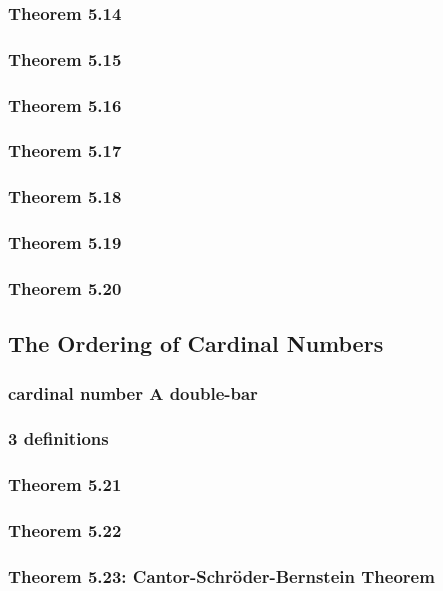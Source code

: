 \documentclass[a4paper]{article}
\begin{document}
\subsubsection*{Theorem 5.14}
\subsubsection*{Theorem 5.15}
\subsubsection*{Theorem 5.16}
\subsubsection*{Theorem 5.17}
\subsubsection*{Theorem 5.18}
\subsubsection*{Theorem 5.19}
\subsubsection*{Theorem 5.20}

\newpage
\subsection{The Ordering of Cardinal Numbers}   %
\subsubsection*{cardinal number A double-bar}
\subsubsection*{3 definitions}
\subsubsection*{Theorem 5.21}
\subsubsection*{Theorem 5.22}
\subsubsection*{Theorem 5.23: Cantor-Schröder-Bernstein Theorem}
\end{document}
